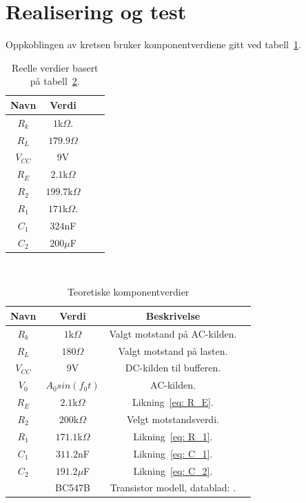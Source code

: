\documentclass[a4paper,11pt,norsk]{article}
\begin{document}
\section{Realisering og test}
\label{sec:realisering}
Oppkoblingen av kretsen bruker komponentverdiene gitt ved tabell~\ref{table: reelle verdier}.
\begin{table}[htbp]
\centering
\begin{tabular}{ |c|c|c|c| } 
\hline
\textbf{Navn} & \textbf{Verdi}\\
\hline
$R_k$ & $1$k$\Omega$.
\\
\hline
$R_L$ & $179.9\Omega$
\\
\hline
$V_{CC}$ & $9$V
\\
\hline
$R_E$ & $2.1$k$\Omega$ \\
\hline
$R_2$ & $199.7$k$\Omega$
\\
\hline
$R_1$ & $171$k$\Omega$.
\\
\hline
$C_1$ & $324$nF
\\
\hline
$C_2$ & $200\mu$F
\\
\hline
\end{tabular}
\caption{Reelle verdier basert på tabell~\ref{table: komponenter}.}
\label{table: reelle verdier}
\end{table}
\\
\begin{table}[htbp]
\centering
\begin{tabular}{ |c|c|c|c| } 
\hline
\textbf{Navn} & \textbf{Verdi} & \textbf{Beskrivelse}\\
\hline

\hline
$R_k$ & $1$k$\Omega$ & Valgt motstand på AC-kilden.
\\
\hline
$R_L$ & $180\Omega$ & Valgt motstand på lasten.
\\
\hline
$V_{CC}$ & $9$V & DC-kilden til bufferen.
\\
\hline
$V_0$ & $A_0 sin(f_0 t)$  & AC-kilden.
\\
\hline
$R_E$ & $2.1$k$\Omega$ & Likning~\ref{eq: R_E}. \\
\hline
$R_2$ & $200$k$\Omega$ & Velgt motstandsverdi.
\\
\hline
$R_1$ & $171.1$k$\Omega$ & Likning~\ref{eq: R_1}.
\\
\hline
$C_1$ & $311.2$nF & Likning~\ref{eq: C_1}.
\\
\hline
$C_2$ & $191.2\mu$F & Likning~\ref{eq: C_2}.
\\
\hline
~ & BC547B & Transistor modell, datablad: \cite{BC547B Datasheet}. \\
\hline
\end{tabular}
\caption{Teoretiske komponentverdier}
\label{table: komponenter}
\end{table}
\end{document}
